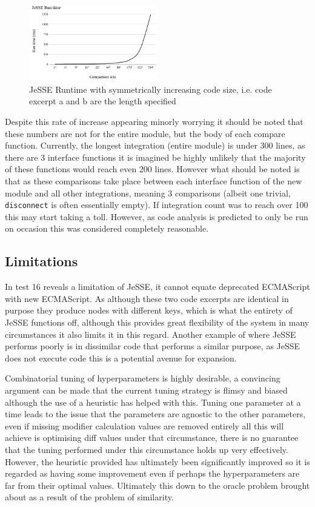 \documentclass[jou,apacite]{apa6}
\begin{document}
\begin{figure}[h]
\caption{JeSSE Runtime with symmetrically increasing code size, i.e. code excerpt a and b are the length specified}
\centering
\includegraphics[width=0.5\textwidth]{jesseefficiency}
\end{figure}

Despite this rate of increase appearing minorly worrying it should be noted that these numbers are not for the entire module, but the body of each compare function. Currently, the longest integration (entire module) is under 300 lines, as there are 3 interface functions it is imagined be highly unlikely that the majority of these functions would reach even 200 lines. However what should be noted is that as these comparisons take place between each interface function of the new module and all other integrations, meaning 3 comparisons (albeit one trivial, \texttt{disconnect} is often essentially empty). If integration count was to reach over 100 this may start taking a toll. However, as code analysis is predicted to only be run on occasion this was considered completely reasonable.

\subsection{Limitations}
 In test 16 reveals a limitation of JeSSE, it cannot equate deprecated ECMAScript with new ECMAScript. As although these two code excerpts are identical in purpose they produce nodes with different keys, which is what the entirety of JeSSE functions off, although this provides great flexibility of the system in many circumstances it also limits it in this regard. Another example of where JeSSE performs poorly is in dissimilar code that performs a similar purpose, as JeSSE does not execute code this is a potential avenue for expansion.
 
 Combinatorial tuning of hyperparameters is highly desirable, a convincing argument can be made that the current tuning strategy is flimsy and biased although the use of a heuristic has helped with this. Tuning one parameter at a time leads to the issue that the parameters are agnostic to the other parameters, even if missing modifier calculation values are removed entirely all this will achieve is optimising diff values under that circumstance, there is no guarantee that the tuning performed under this circumstance holds up very effectively. However, the heuristic provided has ultimately been significantly improved so it is regarded as having some improvement even if perhaps the hyperparameters are far from their optimal values.  Ultimately this down to the oracle problem brought about as a result of the problem of similarity.
 
\end{document}
